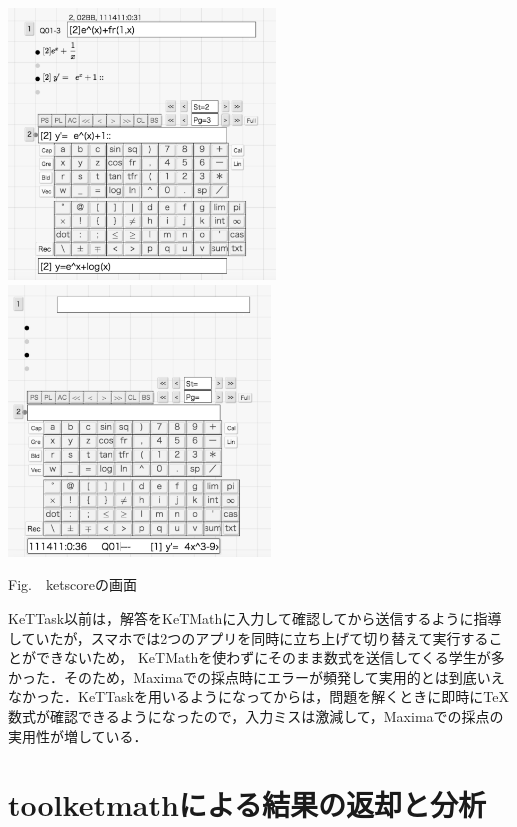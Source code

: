 \documentclass[a4j,12pt]{ujarticle}
\begin{document}
\begin{center}
\includegraphics[bb=0.00 0.00 720.00 730.00,height=72mm]{fig/ketscore1bw.pdf}
\hspace{5mm}%
\includegraphics[bb=0.00 0.00 691.00 715.00,height=72mm]{fig/ketscore3bw.pdf}

\addtocounter{figure}{1}Fig.\thefigure\ \ ketscoreの画面\vspace{-1mm}
\end{center}

KeTTask以前は，解答をKeTMathに入力して確認してから送信するように指導していたが，スマホでは2つのアプリを同時に立ち上げて切り替えて実行することができないため，
KeTMathを使わずにそのまま数式を送信してくる学生が多かった．そのため，Maximaでの採点時にエラーが頻発して実用的とは到底いえなかった．KeTTaskを用いるようになってからは，問題を解くときに即時に\TeX 数式が確認できるようになったので，入力ミスは激減して，Maximaでの採点の実用性が増している．

\section{toolketmathによる結果の返却と分析}
\end{document}
